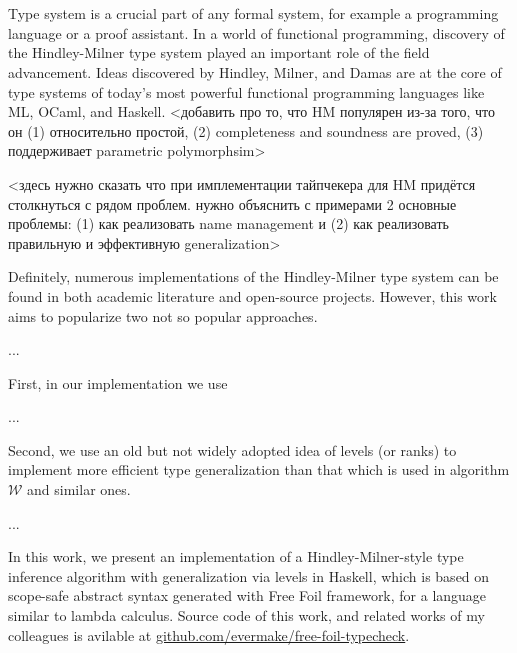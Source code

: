 \chapter{}
\label{chap:intro}


Type system is a crucial part of any formal system, for example a programming language or a proof assistant. In a world of functional programming, discovery of the Hindley-Milner type system played an important role of the field advancement. Ideas discovered by Hindley, Milner, and Damas are at the core of type systems of today's most powerful functional programming languages like ML, OCaml, and Haskell. <добавить про то, что HM популярен из-за того, что он (1) относительно простой, (2) completeness and soundness are proved, (3) поддерживает parametric polymorphsim>

<здесь нужно сказать что при имплементации тайпчекера для HM придётся столкнуться с рядом проблем. нужно объяснить с примерами 2 основные проблемы: (1) как реализовать name management и (2) как реализовать правильную и эффективную generalization>

Definitely, numerous implementations of the Hindley-Milner type system can be found in both academic literature and open-source projects. However, this work aims to popularize two not so popular approaches.

...

First, in our implementation we use

...

Second, we use an old but not widely adopted idea of levels (or ranks) to implement more efficient type generalization than that which is used in algorithm $\mathcal{W}$ and similar ones. 

...

In this work, we present an implementation of a Hindley-Milner-style type inference algorithm with generalization via levels in Haskell, which is based on scope-safe abstract syntax generated with Free Foil framework, for a language similar to lambda calculus. Source code of this work, and related works of my colleagues is avilable at \href{https://github.com/evermake/free-foil-typecheck}{github.com/evermake/free-foil-typecheck}.
